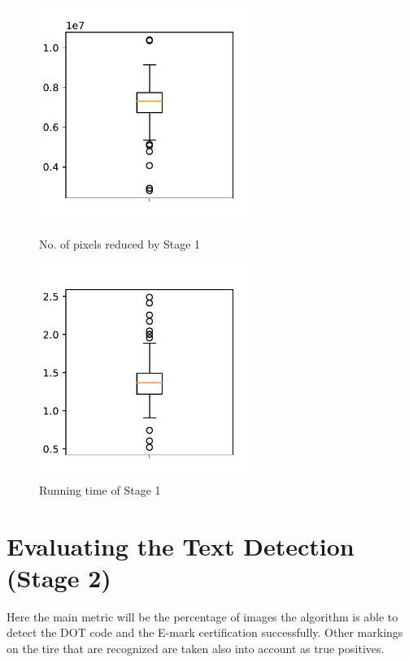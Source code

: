 \begin{figure}
    \centering
    \begin{minipage}[c]{0.5\linewidth}
        \centering
        \includegraphics[height=7cm, keepaspectratio]{img/evaluation/no_of_pixels_reduced-stage1.pdf}
            \caption{No. of pixels reduced by Stage 1}
            \label{fig:pixel_count_reduced-stage1}
    \end{minipage}\hfill
    \begin{minipage}[c]{0.5\linewidth}
        \centering
        \includegraphics[height=7cm, keepaspectratio]{img/evaluation/running_time-stage1.pdf}
            \caption{Running time of Stage 1}
            \label{fig:running_time-stage1}
    \end{minipage}
\end{figure}

\section{Evaluating the Text Detection (Stage 2)}\label{section:evaluation-text_detection}

Here the main metric will be the percentage of images the algorithm is able to detect the DOT code and the E-mark certification successfully. Other markings on the tire that are recognized are taken also into account as true positives.

